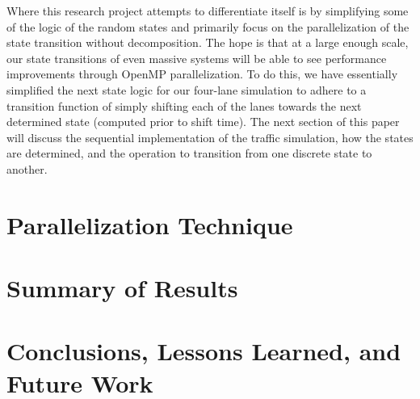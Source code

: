 \documentclass[conference]{IEEEtran}
\begin{document}
Where this research project attempts to differentiate itself is by simplifying some of the logic of the random states and primarily focus on the parallelization of the state transition without decomposition. The hope is that at a large enough scale, our state transitions of even massive systems will be able to see performance improvements through OpenMP parallelization.  To do this, we have essentially simplified the next state logic for our four-lane simulation to adhere to a transition function of simply shifting each of the lanes towards the next determined state (computed prior to shift time).  The next section of this paper will discuss the sequential implementation of the traffic simulation, how the states are determined, and the operation to transition from one discrete state to another.
 \\

\section{Parallelization Technique}
\lipsum[3]

\section{Summary of Results}
\lipsum[4]

\section{Conclusions, Lessons Learned, and Future Work}
\lipsum[5]



\end{document}
